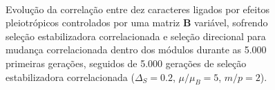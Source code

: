 \begin{figure}[htbp]
    \vspace{-18pt}
    \vspace{11pt}
    \\
    \caption{Evolução da correlação entre dez caracteres ligados por efeitos
        pleiotrópicos controlados por uma matriz $\mathbf{B}$ variável, sofrendo seleção estabilizadora correlacionada e seleção
        direcional para mudança correlacionada dentro dos módulos
        durante as 5.000 primeiras gerações, seguidos de 5.000 gerações de
    seleção estabilizadora correlacionada ($\Delta_S = 0.2$, $\mu/\mu_B=5$, $m/p=2$).}
    \label{posselecao}
\end{figure}

